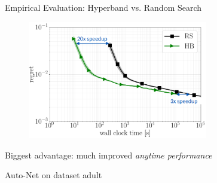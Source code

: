     


    


\begin{frame}{Empirical Evaluation: Hyperband vs. Random Search}

\vskip -10pt
\hskip 270pt

\begin{figure}
    \centering
    \includegraphics[width=0.7\textwidth]{../w07_hpo_speedup/images/hyperband/bohb_2.png}
\end{figure}

\begin{center}
    Biggest advantage: much improved \emph{anytime performance}
    
    \tiny{Auto-Net on dataset adult}
\end{center}

\end{frame}

